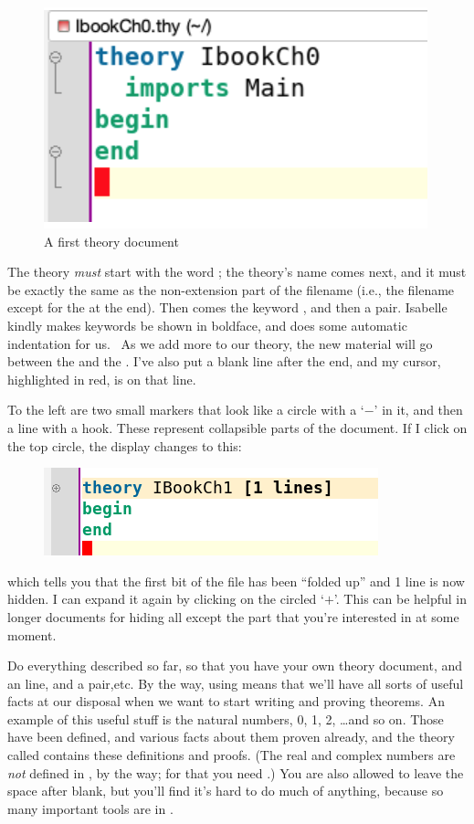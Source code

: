 \begin{figure}[h]
    \centering
    \includegraphics[width=0.5\linewidth]{TEXT/C01//Images/first-theory.png}
    \caption{A first theory document}
    \label{fig:first-theory-doc}
\end{figure}
The theory \textit{must} start with the word ; the theory's name comes next, and it must be exactly the same as the non-extension part of the filename (i.e., the filename except for the  at the end). Then comes the keyword , and then a  pair. Isabelle kindly makes keywords be shown in boldface, and does some automatic indentation for us.  As we add more to our theory, the new material will go between the  and the . I've also put a blank line after the end, and my cursor, highlighted in red, is on that line. 

To the left are two small markers that look like a circle with a `$-$' in it, and then a line with a hook. These represent collapsible parts of the document. If I click on the top circle, the display changes to this:
\begin{figure}[h]
    \centering
    \includegraphics[width=0.5\linewidth]{TEXT/C01//Images/folded-theory.png}
\end{figure}
\noindent which tells you that the first bit of the file has been ``folded up'' and 1 line is now hidden. I can expand it again by clicking on the circled `$+$'. This can be helpful in longer documents for hiding all except the part that you're interested in at some moment. 

\task
Do everything described so far, so that you have your own theory document, and an  line, and a  pair,etc.
\etask
By the way, using  means that we'll have all sorts of useful facts at our disposal when we want to start writing and proving theorems. An example of this useful stuff is the natural numbers, 0, 1, 2, \ldots  and so on. Those have been defined, and various facts about them proven already, and the theory called  contains these definitions and proofs. (The real and complex numbers are \textit{not} defined in , by the way; for that you need .) You are also allowed to  leave the space after  blank, but you'll find it's hard to do much of anything, because so many important tools are in .

